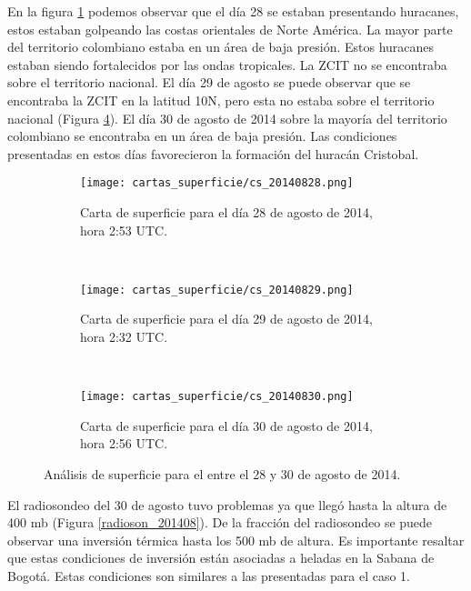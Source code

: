 \begin{itemize}
En la figura \ref{carta_caso2_20140828} podemos observar que el día 28 se estaban presentando huracanes, estos estaban golpeando las costas orientales de Norte América. La mayor parte del territorio colombiano estaba en un área de baja presión. Estos huracanes estaban siendo fortalecidos por las ondas tropicales. La ZCIT no se encontraba sobre el territorio nacional. El día 29 de agosto se puede observar que se encontraba la ZCIT en la latitud 10\degree N, pero esta no estaba sobre el territorio nacional (Figura \ref{carta_caso2_20140829}). El día 30 de agosto de 2014 sobre la mayoría del territorio colombiano se encontraba en un área de baja presión. Las condiciones presentadas en estos días favorecieron la formación del huracán Cristobal.

\begin{figure}
\begin{subfigure}[normla]{0.5\textwidth}
\caption{Carta de superficie para el día 28 de agosto de 2014, hora 2:53 UTC.}
\texttt{[image: cartas\_superficie/cs\_20140828.png]}
\label{carta_caso2_20140828}
\end{subfigure}
~
\begin{subfigure}[normla]{0.5\textwidth}
\caption{Carta de superficie para el día 29 de agosto de 2014, hora 2:32 UTC.}
\texttt{[image: cartas\_superficie/cs\_20140829.png]}
\label{carta_caso2_20140829}
\end{subfigure}

~
\centering
\begin{subfigure}[normla]{0.5\textwidth}
\caption{Carta de superficie para el día 30 de agosto de 2014, hora 2:56 UTC.}
\texttt{[image: cartas\_superficie/cs\_20140830.png]}
\label{carta_caso2_20140830}
\end{subfigure}

\caption{Análisis de superficie para el entre el 28 y 30 de agosto de 2014.}
\label{carta_caso2_20140829}
\end{figure}

El radiosondeo del 30 de agosto tuvo problemas ya que llegó hasta la altura de 400 mb (Figura \ref{radioson_201408}). De la fracción del radiosondeo se puede observar una inversión térmica hasta los 500 mb de altura. Es importante resaltar que estas condiciones de inversión están asociadas a heladas en la Sabana de Bogotá. Estas condiciones son similares a las presentadas para el caso 1.\\



\end{itemize}
